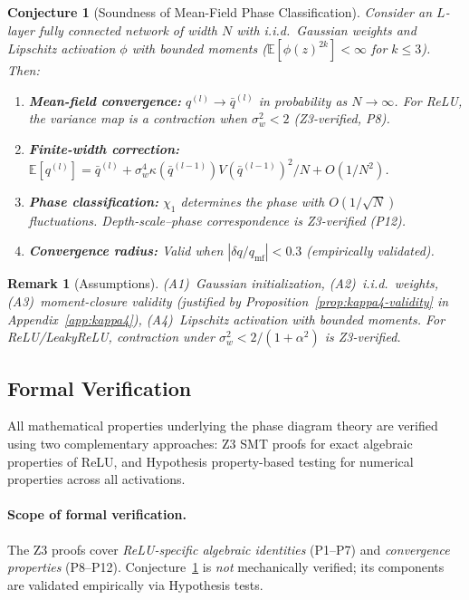 \documentclass[10pt]{article}
\newcommand{\EE}{\mathbb{E}}
\newtheorem{conjecture}[theorem]{Conjecture}
\newtheorem{remark}[theorem]{Remark}
\begin{document}
\begin{conjecture}[Soundness of Mean-Field Phase Classification]
\label{thm:soundness}
Consider an $L$-layer fully connected network of width $N$ with i.i.d.\ Gaussian weights and Lipschitz activation $\phi$ with bounded moments ($\EE[\phi(z)^{2k}] < \infty$ for $k \leq 3$). Then:
\begin{enumerate}[nosep]
    \item \textbf{Mean-field convergence:} $q^{(l)} \to \bar{q}^{(l)}$ in probability as $N \to \infty$. For ReLU, the variance map is a contraction when $\sigma_w^2 < 2$ (Z3-verified, P8).
    \item \textbf{Finite-width correction:} $\EE[q^{(l)}] = \bar{q}^{(l)} + \sigma_w^4 \kappa(\bar{q}^{(l-1)}) V(\bar{q}^{(l-1)})^2 / N + O(1/N^2)$.
    \item \textbf{Phase classification:} $\chi_1$ determines the phase with $O(1/\sqrt{N})$ fluctuations. Depth-scale--phase correspondence is Z3-verified (P12).
    \item \textbf{Convergence radius:} Valid when $|\delta q / q_{\mathrm{mf}}| < 0.3$ (empirically validated).
\end{enumerate}
\end{conjecture}

\begin{remark}[Assumptions]
(A1)~Gaussian initialization, (A2)~i.i.d.\ weights, (A3)~moment-closure validity (justified by Proposition~\ref{prop:kappa4-validity} in Appendix~\ref{app:kappa4}), (A4)~Lipschitz activation with bounded moments.
For ReLU/LeakyReLU, contraction under $\sigma_w^2 < 2/(1+\alpha^2)$ is Z3-verified.
\end{remark}

\subsection{Formal Verification}
\label{sec:verification}

All mathematical properties underlying the phase diagram theory are verified using two complementary approaches: Z3 SMT proofs for exact algebraic properties of ReLU, and Hypothesis property-based testing for numerical properties across all activations.

\paragraph{Scope of formal verification.}
The Z3 proofs cover \emph{ReLU-specific algebraic identities} (P1--P7) and \emph{convergence properties} (P8--P12).
Conjecture~\ref{thm:soundness} is \emph{not} mechanically verified; its components are validated empirically via Hypothesis tests.
\end{document}
